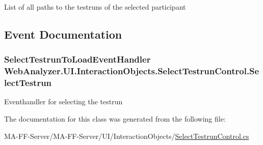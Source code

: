 List of all paths to the testruns of the selected participant 



\subsection{Event Documentation}
\hypertarget{class_web_analyzer_1_1_u_i_1_1_interaction_objects_1_1_select_testrun_control_add98c79fa38a7db09d583d84dbbce933}{}
\subsubsection[{Select\+Testrun}]{\setlength{\rightskip}{0pt plus 5cm}Select\+Testrun\+To\+Load\+Event\+Handler Web\+Analyzer.\+U\+I.\+Interaction\+Objects.\+Select\+Testrun\+Control.\+Select\+Testrun}\label{class_web_analyzer_1_1_u_i_1_1_interaction_objects_1_1_select_testrun_control_add98c79fa38a7db09d583d84dbbce933}


Eventhandler for selecting the testrun 



The documentation for this class was generated from the following file\+:\begin{DoxyCompactItemize}
\item 
M\+A-\/\+F\+F-\/\+Server/\+M\+A-\/\+F\+F-\/\+Server/\+U\+I/\+Interaction\+Objects/\hyperlink{_select_testrun_control_8cs}{Select\+Testrun\+Control.\+cs}\end{DoxyCompactItemize}
